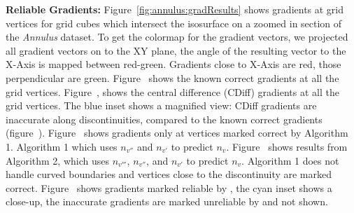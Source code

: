 \textbf{Reliable Gradients:}
Figure~\ref{fig:annulus:gradResults} shows gradients at grid vertices for grid cubes which intersect the isosurface on a zoomed in section of the \textit{Annulus} dataset.
To get the colormap for the gradient vectors, we projected all gradient vectors on to the XY plane, the angle of the resulting vector to the X-Axis is mapped between red-green. Gradients close to X-Axis are red, those perpendicular are green. 
Figure~\protect{} shows the known correct gradients at all the grid vertices.  Figure~, shows the central difference (CDiff) gradients at all the grid vertices. The blue inset shows a magnified view: CDiff gradients are inaccurate along discontinuities, compared to the known correct gradients (figure~).  Figure~ shows gradients only at vertices marked correct by Algorithm 1. Algorithm 1  which uses $n_{v''}$ and $n_{v'}$ to predict $n_v$. Figure~\protect{} shows results from Algorithm 2, which uses $n_{v'''}$, $n_{v''}$, and $n_{v'}$ to predict $n_v$. 
Algorithm 1 does not handle curved boundaries and vertices close to the discontinuity are marked correct. Figure~ shows gradients marked reliable by \protect\ReliGrad, the cyan inset shows a close-up, the inaccurate gradients are marked unreliable  by \ReliGrad and not shown. 

